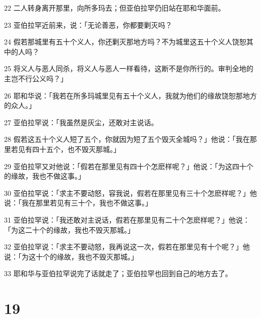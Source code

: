 \par 22 二人转身离开那里，向所多玛去；但亚伯拉罕仍旧站在耶和华面前。
\par 23 亚伯拉罕近前来，说：「无论善恶，你都要剿灭吗？
\par 24 假若那城里有五十个义人，你还剿灭那地方吗？不为城里这五十个义人饶恕其中的人吗？
\par 25 将义人与恶人同杀，将义人与恶人一样看待，这断不是你所行的。审判全地的主岂不行公义吗？」
\par 26 耶和华说：「我若在所多玛城里见有五十个义人，我就为他们的缘故饶恕那地方的众人。」
\par 27 亚伯拉罕说：「我虽然是灰尘，还敢对主说话。
\par 28 假若这五十个义人短了五个，你就因为短了五个毁灭全城吗？」他说：「我在那里若见有四十五个，也不毁灭那城。」
\par 29 亚伯拉罕又对他说：「假若在那里见有四十个怎麽样呢？」他说：「为这四十个的缘故，我也不做这事。」
\par 30 亚伯拉罕说：「求主不要动怒，容我说，假若在那里见有三十个怎麽样呢？」他说：「我在那里若见有三十个，我也不做这事。」
\par 31 亚伯拉罕说：「我还敢对主说话，假若在那里见有二十个怎麽样呢？」他说：「为这二十个的缘故，我也不毁灭那城。」
\par 32 亚伯拉罕说：「求主不要动怒，我再说这一次，假若在那里见有十个呢？」他说：「为这十个的缘故，我也不毁灭那城。」
\par 33 耶和华与亚伯拉罕说完了话就走了；亚伯拉罕也回到自己的地方去了。

\chapter{19}

